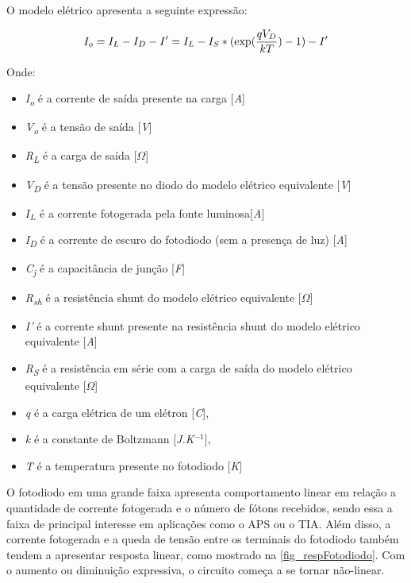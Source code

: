     O modelo el\'etrico apresenta a seguinte expressão:

\begin{equation}
    \label{eq_modEletFot}
    I_o = I_L - I_D - I\rq = I_L - I_S*(\exp (\frac{qV_D}{kT})-1) - I\rq
\end{equation}

Onde:
\begin{itemize}
    \item \textit{I\textsubscript{o}} \'e a corrente de saída presente na carga [\textit{A}]
    \item \textit{V\textsubscript{o}} \'e a tensão de saída [\textit{V}]
    \item \textit{R\textsubscript{L}} \'e a carga de saída [\textit{$\Omega$}]
    \item \textit{V\textsubscript{D}} \'e a tensão presente no diodo do modelo el\'etrico equivalente [\textit{V}]
    \item $I_L$ \'e a corrente fotogerada pela fonte luminosa[\textit{A}]
    \item  \textit{I\textsubscript{D}} \'e a corrente de escuro do fotodiodo (sem a presença de luz) [\textit{A}]
    \item \textit{C\textsubscript{j}} \'e a capacit\^ancia de junção [\textit{F}]
    \item \textit{R\textsubscript{sh}} \'e a resist\^encia shunt do modelo el\'etrico equivalente [$\Omega$]
    \item \textit{I\rq} \'e a corrente shunt presente na resistência shunt do modelo el\'etrico equivalente [\textit{A}]
    \item \textit{R\textsubscript{S}} \'e a resistência em s\'erie com a carga de saída do modelo el\'etrico equivalente [$\Omega$]
    \item \textit{q} \'e a carga el\'etrica de um el\'etron [\textit{C}],
    \item \textit{k} \'e a constante de Boltzmann [\textit{J.K$^{-1}$}],
    \item \textit{T} \'e a temperatura presente no fotodiodo [\textit{K}]
\end{itemize}

O fotodiodo em uma grande faixa apresenta comportamento linear em relação a quantidade de corrente fotogerada e o número de fótons recebidos, sendo essa a faixa de principal interesse em aplicações como o APS ou o TIA. Além disso, a corrente fotogerada e a queda de tensão entre os terminais do fotodiodo também tendem a apresentar resposta linear, como mostrado na \autoref{fig_respFotodiodo}. Com o aumento ou diminuição expressiva, o circuito começa a se tornar não-linear.

